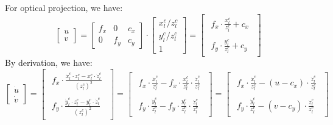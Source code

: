\documentclass[12pt, onecolumn]{article}
\begin{document}
	For optical projection, we have:
	\begin{equation}
	\begin{bmatrix}
	u\\v
	\end{bmatrix}=\begin{bmatrix}
	f_x&0&c_x\\
	0&f_y&c_y
	\end{bmatrix}\cdot
	\begin{bmatrix}
	x_l^c/z_l^c\\
	y_l^c/z_l^c\\
	1
	\end{bmatrix}=\begin{bmatrix}
	\begin{aligned}
		f_x\cdot\frac{x_l^c}{z_l^c}+c_x
	\end{aligned}\\
		\begin{aligned}
			f_y\cdot\frac{y_l^c}{z_l^c}+c_y
		\end{aligned}
	\end{bmatrix}
	\end{equation}
	By derivation, we have:
	\begin{equation}
	\begin{bmatrix}
		\dot{u}\\\dot{v}
	\end{bmatrix}=\begin{bmatrix}
	\begin{aligned}
		f_x\cdot\frac{\dot{x}^c_l\cdot z_l^c-x^c_l\cdot \dot{z}^c_l}{\left( z_l^c\right) ^2}
	\end{aligned}\\
		\begin{aligned}
			f_y\cdot\frac{\dot{y}^c_l\cdot z_l^c-y^c_l\cdot \dot{z}^c_l}{\left( z_l^c\right) ^2}
		\end{aligned}
	\end{bmatrix}=\begin{bmatrix}
	\begin{aligned}
		f_x\cdot\frac{\dot{x}^c_l}{z_l^c}-
		f_x\cdot\frac{x^c_l}{z_l^c}
		\cdot\frac{\dot{z}^c_l}{z_l^c}
	\end{aligned}\\
		\begin{aligned}
		f_y\cdot\frac{\dot{y}^c_l}{z_l^c}-
		f_y\cdot\frac{y^c_l}{z_l^c}
		\cdot\frac{\dot{z}^c_l}{z_l^c}
		\end{aligned}
	\end{bmatrix}=\begin{bmatrix}
	\begin{aligned}
		f_x\cdot\frac{\dot{x}^c_l}{z_l^c}-
		\left( u-c_x\right) \cdot
		\frac{\dot{z}^c_l}{z_l^c}
	\end{aligned}\\
		\begin{aligned}
		f_y\cdot\frac{\dot{y}^c_l}{z_l^c}-
		\left( v-c_y\right) \cdot
		\frac{\dot{z}^c_l}{z_l^c}
		\end{aligned}
	\end{bmatrix}
	\end{equation}
\end{document}
